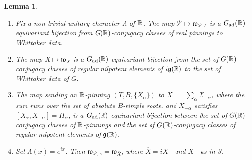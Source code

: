 \documentclass{article}
\newtheorem{lem}[thm]{Lemma}
\theoremstyle{definition}
\numberwithin{equation}{section}
\renewcommand{\-}{\hyp{}}
\newcommand{\g}{\mathfrak g}
\renewcommand{\P}{\mathcal P}
\newcommand{\w}{\mathfrak w}
\begin{document}
\begin{lem} \label{lem:w1}
\begin{enumerate}
\item Fix a non-trivial unitary character $\Lambda$ of $\mathbb{R}$. The map $\P\mapsto \w_{\P,\Lambda}$ is a $G_{\textrm{ad}}(\mathbb{R})$-equivariant bijection from $G(\mathbb{R})$-conjugacy classes of real pinnings to Whittaker data.
\item The map $X \mapsto \w_X$ is a $G_{\textrm{ad}}(\mathbb{R})$-equivariant bijection from the set of $G(\mathbb{R})$-conjugacy classes of regular nilpotent elements of $i\g(\R)$ to the set of Whittaker data of $G$.
\item The map sending an $\mathbb{R}$-pinning $(T,B,\{X_\alpha\})$ to $X_-=\sum_\alpha X_{-\alpha}$, where the sum runs over the set of absolute $B$-simple roots, and $X_{-\alpha}$ satisfies $[X_\alpha,X_{-\alpha}]=H_\alpha$, is a $G_{\textrm{ad}}(\mathbb{R})$-equivariant bijection between the set of $G(\mathbb{R})$-conjugacy classes of $\mathbb{R}$-pinnings and the set of $G(\mathbb{R})$-conjugacy classes of regular nilpotent elements of $\mathfrak{g}(\mathbb{R})$.
\item Set $\Lambda(x)=e^{ix}$. Then $\w_{\P,\Lambda}=\w_{\overline X}$, where $\overline X=iX_-$ and $X_-$ as in 3.
\end{enumerate}
\end{lem}
\end{document}
